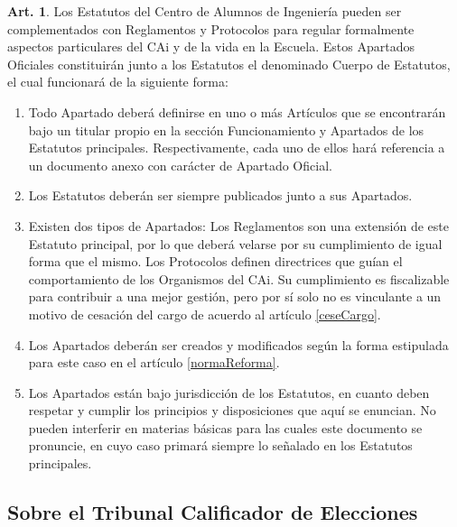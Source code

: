 \documentclass[letterpaper,11pt]{article}
\theoremstyle{definition}%
\newtheorem{art}{Art.} %
\newcommand{\aref}[1]{\hyperref[#1]{\ref*{#1}}}
\begin{document}
\begin{art}\label{definicionApartados}
	Los Estatutos del Centro de Alumnos de Ingeniería pueden ser complementados con Reglamentos y Protocolos para regular formalmente aspectos particulares del CAi y de la vida en la Escuela. Estos Apartados Oficiales constituirán junto a los Estatutos el denominado Cuerpo de Estatutos, el cual funcionará de la siguiente forma:
	\begin{enumerate}
		\item Todo Apartado deberá definirse en uno o más Artículos que se encontrarán bajo un titular propio en la sección Funcionamiento y Apartados de los Estatutos principales. Respectivamente, cada uno de ellos hará referencia a un documento anexo con carácter de Apartado Oficial.
		\item Los Estatutos deberán ser siempre publicados junto a sus Apartados.
		\item Existen dos tipos de Apartados: Los Reglamentos son una extensión de este Estatuto principal, por lo que deberá velarse por su cumplimiento de igual forma que el mismo. Los Protocolos definen directrices que guían el comportamiento de los Organismos del CAi. Su cumplimiento es fiscalizable para contribuir a una mejor gestión, pero por sí solo no es vinculante a un motivo de cesación del cargo de acuerdo al artículo \aref{ceseCargo}.
		\item Los Apartados deberán ser creados y modificados según la forma estipulada para este caso en el artículo \aref{normaReforma}.
		\item Los Apartados están bajo jurisdicción de los Estatutos, en cuanto deben respetar y cumplir los principios y disposiciones que aquí se enuncian. No pueden interferir en materias básicas para las cuales este documento se pronuncie, en cuyo caso primará siempre lo señalado en los Estatutos principales.
	\end{enumerate}
\end{art}

\subsection*{Sobre el Tribunal Calificador de Elecciones}
\end{document}
